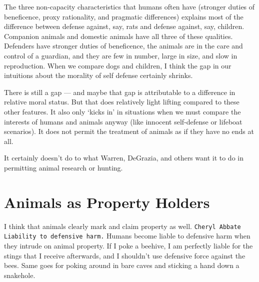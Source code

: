	The three non-capacity characteristics that humans often have (stronger
	duties of beneficence, proxy rationality, and pragmatic differences)
	explains most of the difference between defense against, say, rats and
	defense against, say, children.  Companion animals and domestic animals
	have all three of these qualities.  Defenders have stronger duties of
	beneficence, the animals are in the care and control of a guardian, and
	they are few in number, large in size, and slow in reproduction. When we
	compare dogs and children, I think the gap in our intuitions about the
	morality of self defense certainly shrinks.

	There is still a gap --- and maybe that gap is attributable to a difference
	in relative moral status. But that does relatively light lifting compared to
	these other features. It also only ‘kicks in’ in situations when we must
	compare the interests of humans and animals anyway (like innocent
	self-defense or lifeboat scenarios). It does not permit the treatment of
	animals as if they have no ends at all.

	It certainly doesn’t do to what Warren, DeGrazia, and others want it to do
	in permitting animal research or hunting.

\section{Animals as Property Holders}

	I think that animals clearly mark and claim property as well.
	\texttt{Cheryl Abbate Liability to defensive harm.} Humans become liable to
	defensive harm when they intrude on animal property.  If I poke a beehive,
	I am perfectly liable for the stings that I receive afterwards, and I
	shouldn’t use defensive force against the bees.  Same goes for poking
	around in bare caves and sticking a hand down a snakehole.
